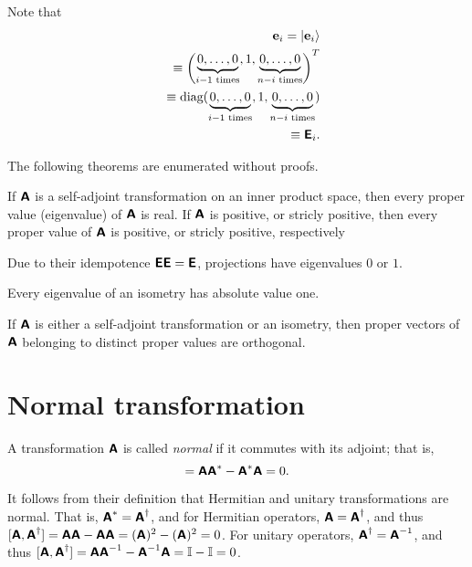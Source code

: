 {Note that
\begin{equation}
\begin{split}
{\bf e}_i=\vert {\bf e}_i \rangle  \\
\quad \equiv \begin{pmatrix} \underbrace{0,\ldots , 0}_{i-1 \textrm{ times}}, 1, \underbrace{0,\ldots , 0}_{n-i \textrm{ times}} \end{pmatrix}^T   \\
\quad \equiv  \textrm{diag}(  \underbrace{0,\ldots , 0}_{i-1 \textrm{ times}}, 1, \underbrace{0,\ldots , 0}_{n-i \textrm{ times}}  )
  \\
\quad \equiv  \textsf{\textbf{E}}_{i}.
\end{split}
\end{equation}
{\textrm{\eexample}}
}


The following theorems are enumerated without proofs.

If $\textsf{\textbf{A}}$
is a self-adjoint transformation on an inner product space, then every proper value (eigenvalue)  of $\textsf{\textbf{A}}$
is real.
If $\textsf{\textbf{A}}$ is positive, or stricly positive,
then every proper value of  $\textsf{\textbf{A}}$ is positive, or stricly positive, respectively

Due to their idempotence $\textsf{\textbf{E}}\textsf{\textbf{E}}=\textsf{\textbf{E}}$,
projections have eigenvalues $0$ or $1$.

Every eigenvalue of an isometry has absolute value one.

If  $\textsf{\textbf{A}}$  is either a self-adjoint transformation or an isometry,
then proper vectors of $ \textsf{\textbf{A}}$
belonging to distinct proper values are orthogonal.


\section{Normal transformation}
\label{2014-m-fdvs-normality}

A transformation $\textsf{\textbf{A}}$ is called {\em normal}
if it commutes with its adjoint; that is,
\begin{equation}
[\textsf{\textbf{A}},\textsf{\textbf{A}}^\ast ]= \textsf{\textbf{A}}\textsf{\textbf{A}}^\ast  -
\textsf{\textbf{A}}^\ast  \textsf{\textbf{A}} =0.
\end{equation}


It follows from their definition that Hermitian and unitary transformations are normal. That is,
$\textsf{\textbf{A}}^\ast =\textsf{\textbf{A}}^\dagger$,
and for Hermitian operators,
$\textsf{\textbf{A}}=\textsf{\textbf{A}}^\dagger$,
and thus
$[\textsf{\textbf{A}},\textsf{\textbf{A}}^\dagger]= \textsf{\textbf{A}}\textsf{\textbf{A}} -
\textsf{\textbf{A}} \textsf{\textbf{A}} =(\textsf{\textbf{A}})^2 -(\textsf{\textbf{A}})^2=0$.
For unitary operators,
$\textsf{\textbf{A}}^\dagger =\textsf{\textbf{A}}^{-1}$,
and thus
$[\textsf{\textbf{A}},\textsf{\textbf{A}}^\dagger]= \textsf{\textbf{A}}\textsf{\textbf{A}}^{-1} -
\textsf{\textbf{A}}^{-1} \textsf{\textbf{A}} ={\Bbb I} -{\Bbb I} =0$.


